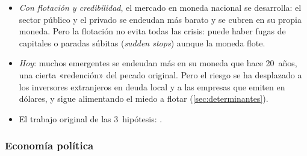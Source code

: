\documentclass[11pt]{article}
\begin{document}
\begin{itemize}
\begin{itemize}
\begin{itemize}
    \end{itemize}
  \item \emph{Problemas de compromiso}: el que presta hoy cobra mañana, y lo que conviene a las 2~partes antes puede no convenir al deudor después; si las instituciones no garantizan el cobro, los contratos no se cumplen solos. La solución es institucional (mejores derechos de los acreedores) y el régimen importa menos: la flexibilidad deja al banco central sostener al sistema financiero en apuros, pero los acreedores, que lo anticipan, piden tipos más altos.
  \end{itemize}
\item \emph{Con flotación y credibilidad}, el mercado en moneda nacional se desarrolla: el sector público y el privado se endeudan más barato y se cubren en su propia moneda. Pero la flotación no evita todas las crisis: puede haber fugas de capitales o paradas súbitas (\emph{sudden stops}) aunque la moneda flote.
\item \emph{Hoy}: muchos emergentes se endeudan más en su moneda que hace 20~años, una cierta «redención» del pecado original. Pero el riesgo se ha desplazado a los inversores extranjeros en deuda local y a las empresas que emiten en dólares, y sigue alimentando el miedo a flotar (\ref{sec:determinantes}).
\end{itemize}

\begin{anotaciones}
\begin{itemize}
\item El trabajo original de las 3~hipótesis: \textcite{EichengreenHausmann1999}.
\end{itemize}
\end{anotaciones}

\subsubsection{Economía política}\label{sec:economia-politica}
\end{document}
